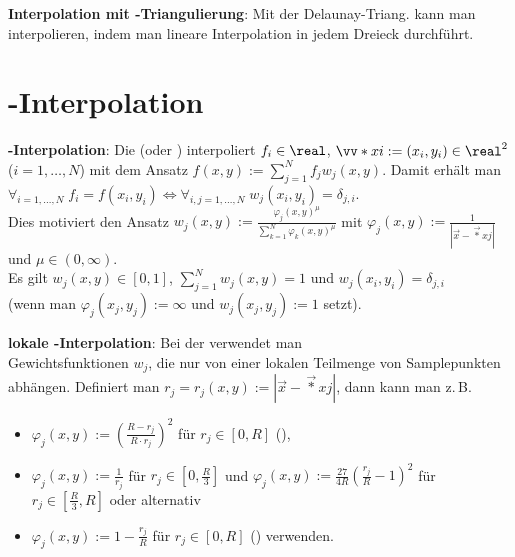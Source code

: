 \textbf{Interpolation mit -Triangulierung}:
Mit der Delaunay-Triang. kann man interpolieren,
indem man lineare Interpolation in jedem Dreieck durchführt.

\section{%
    -Interpolation%
}

\textbf{-Interpolation}:
Die  (oder )
interpoliert $f_i \in \real$, $\vec*{x}{i} := (x_i, y_i) \in \real^2$ ($i = 1, \dotsc, N$)
mit dem Ansatz $f(x, y) := \sum_{j=1}^N f_j w_j(x, y)$.
Damit erhält man $\forall_{i=1,\dotsc,N}\; f_i = f(x_i, y_i) \iff
\forall_{i,j=1,\dotsc,N}\; w_j(x_i, y_i) = \delta_{j,i}$.\\
Dies motiviert den Ansatz
$w_j(x, y) := \frac{\varphi_j(x, y)^\mu}{\sum_{k=1}^N \varphi_k(x, y)^\mu}$ mit
$\varphi_j(x, y) := \frac{1}{|\vec{x} - \vec*{x}{j}|}$ und $\mu \in (0, \infty)$.\\
Es gilt $w_j(x, y) \in [0, 1]$, $\sum_{j=1}^N w_j(x, y) = 1$ und $w_j(x_i, y_i) = \delta_{j,i}$\\
(wenn man $\varphi_j(x_j, y_j) := \infty$ und $w_j(x_j, y_j) := 1$ setzt).

\linie

\textbf{lokale -Interpolation}:
Bei der  verwendet man\\
Gewichtsfunktionen $w_j$, die nur von einer lokalen Teilmenge von Samplepunkten abhängen.
Definiert man $r_j = r_j(x, y) := |\vec{x} - \vec*{x}{j}|$, dann
kann man z.\,B.
\begin{itemize}
    \item
    $\varphi_j(x, y) := \left(\frac{R - r_j}{R \cdot r_j}\right)^2$ für $r_j \in [0, R]$
    (),

    \item
    $\varphi_j(x, y) := \frac{1}{r_j}$ für $r_j \in [0, \frac{R}{3}]$ und
    $\varphi_j(x, y) := \frac{27}{4R} \left(\frac{r_j}{R} - 1\right)^2$ für
    $r_j \in [\frac{R}{3}, R]$ oder alternativ

    \item
    $\varphi_j(x, y) := 1 - \frac{r_j}{R}$ für $r_j \in [0, R]$
    () verwenden.
\end{itemize}


